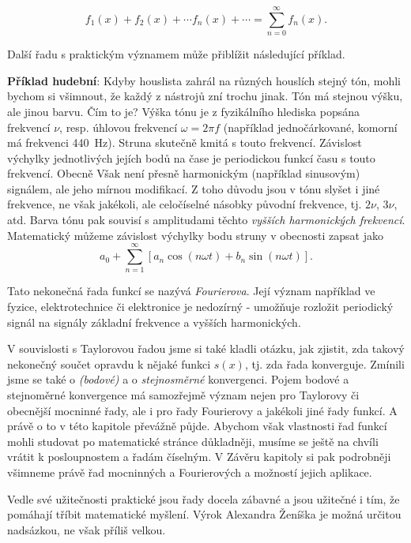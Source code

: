   \begin{equation*}
    f_1(x) + f_2(x) + \cdots f_n(x) + \cdots = \sum_{n=0}^\infty f_n(x).
  \end{equation*}

  Další řadu s praktickým významem může přiblížit následující příklad.

  \textbf{Příklad hudební}: Kdyby houslista zahrál na různých houslích stejný tón, mohli bychom si
  všimnout, že každý z nástrojů zní trochu jinak. Tón má stejnou výšku, ale jinou barvu. Čím to je?
  Výška tónu je z fyzikálního hlediska popsána frekvencí \(\nu\), resp. úhlovou frekvencí \(\omega
  = 2\pi f\) (například jednočárkované, komorní  má frekvenci \SI{440}{\Hz}). Struna skutečně
  kmitá s touto frekvencí. Závislost výchylky jednotlivých jejích bodů na čase je periodickou funkcí
  času s touto frekvencí. Obecně Však není přesně harmonickým (například sinusovým) signálem, ale
  jeho mírnou modifikací. Z toho důvodu jsou v tónu slyšet i jiné frekvence, ne však jakékoli, ale
  celočíselné násobky původní frekvence, tj. \(2\nu\), \(3\nu\), atd. Barva tónu pak souvisí s
  amplitudami těchto \emph{vyšších harmonických frekvencí}. Matematický můžeme závislost výchylky
  bodu struny v obecnosti zapsat jako
  \begin{equation*}
    a_0 + \sum_{n=1}^\infty[a_n\cos(n\omega t) + b_n\sin(n\omega t)].
  \end{equation*}

  Tato nekonečná řada funkcí se nazývá \emph{Fourierova}. Její význam například ve fyzice,
  elektrotechnice či elektronice je nedozírný - umožňuje rozložit periodický signál na signály
  základní frekvence a vyšších harmonických.

  V souvislosti s Taylorovou řadou jsme si také kladli otázku, jak zjistit, zda takový nekonečný
  součet opravdu  k nějaké funkci \(s(x)\), tj. zda řada konverguje. Zmínili jsme se
  také o  \emph{(bodové)} a o \emph{stejnosměrné} konvergenci. Pojem bodové a
  stejnoměrné konvergence má samozřejmě význam nejen pro Taylorovy či obecnější mocninné řady, ale i
  pro řady Fourierovy a jakékoli jiné řady funkcí. A právě o to v této kapitole převážně půjde.
  Abychom však vlastnosti řad funkcí mohli studovat po matematické stránce důkladněji, musíme se
  ještě na chvíli vrátit k posloupnostem a řadám číselným. V Závěru kapitoly si pak podrobněji
  všimneme právě řad mocninných a Fourierových a možností jejich aplikace.

  Vedle své užitečnosti praktické jsou řady docela zábavné a jsou užitečné i tím, že pomáhají tříbit
  matematické myšlení. Výrok Alexandra Ženíška   je možná určitou nadsázkou, ne však příliš velkou.

